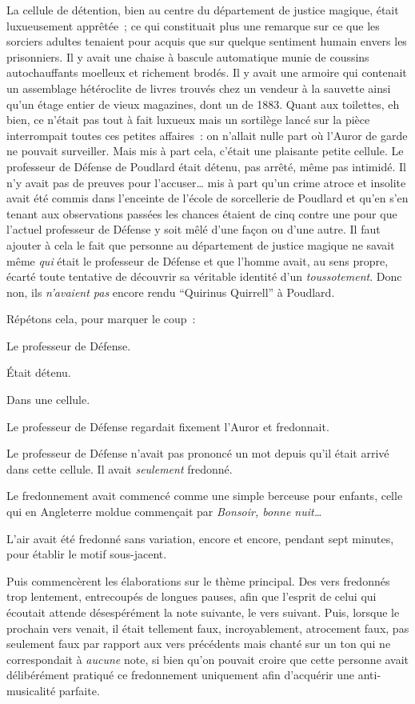 \later

La cellule de détention, bien au centre du département de justice magique, était luxueusement apprêtée~; ce qui constituait plus une remarque sur ce que les sorciers adultes tenaient pour acquis que sur quelque sentiment humain envers les prisonniers.
Il y avait une chaise à bascule automatique munie de coussins autochauffants moelleux et richement brodés.
Il y avait une armoire qui contenait un assemblage hétéroclite de livres trouvés chez un vendeur à la sauvette ainsi qu'un étage entier de vieux magazines, dont un de 1883.
Quant aux toilettes, eh bien, ce n'était pas tout à fait luxueux mais un sortilège lancé sur la pièce interrompait toutes ces petites affaires~: on n'allait nulle part où l'Auror de garde ne pouvait surveiller.
Mais mis à part cela, c'était une plaisante petite cellule.
Le professeur de Défense de Poudlard était détenu, pas arrêté, même pas intimidé.
Il n'y avait pas de preuves pour l'accuser… mis à part qu'un crime atroce et insolite avait été commis dans l'enceinte de l'école de sorcellerie de Poudlard et qu'en s'en tenant aux observations passées les chances étaient de cinq contre une pour que l'actuel professeur de Défense y soit mêlé d'une façon ou d'une autre.
Il faut ajouter à cela le fait que personne au département de justice magique ne savait même \emph{qui} était le professeur de Défense et que l'homme avait, au sens propre, écarté toute tentative de découvrir sa véritable identité d'un \emph{toussotement}.
Donc non, ils \emph{n'avaient pas} encore rendu “Quirinus Quirrell” à Poudlard.

Répétons cela, pour marquer le coup~:

Le professeur de Défense.

Était détenu.

Dans une cellule.

Le professeur de Défense regardait fixement l'Auror et fredonnait.

Le professeur de Défense n'avait pas prononcé un mot depuis qu'il était arrivé dans cette cellule.
Il avait \emph{seulement} fredonné.

Le fredonnement avait commencé comme une simple berceuse pour enfants, celle qui en Angleterre moldue commençait par \emph{Bonsoir, bonne nuit…}

L'air avait été fredonné sans variation, encore et encore, pendant sept minutes, pour établir le motif sous-jacent.

Puis commencèrent les élaborations sur le thème principal.
Des vers fredonnés trop lentement, entrecoupés de longues pauses, afin que l'esprit de celui qui écoutait attende désespérément la note suivante, le vers suivant.
Puis, lorsque le prochain vers venait, il était tellement faux, incroyablement, atrocement faux, pas seulement faux par rapport aux vers précédents mais chanté sur un ton qui ne correspondait à \emph{aucune} note, si bien qu'on pouvait croire que cette personne avait délibérément pratiqué ce fredonnement uniquement afin d'acquérir une anti-musicalité parfaite.

